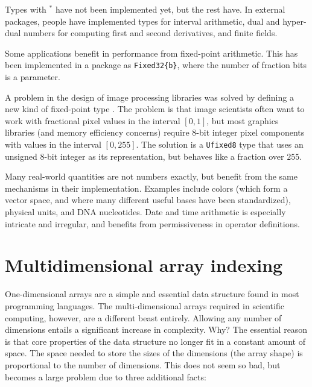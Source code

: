 \noindent
Types with $^*$ have not been implemented yet, but the rest have.
In external packages, people have implemented types for interval arithmetic,
dual and hyper-dual numbers for computing first and second derivatives,
and finite fields.

Some applications benefit in performance from fixed-point arithmetic.
This has been implemented in a package as \texttt{Fixed32\{b\}}, where
the number of fraction bits is a parameter.

A problem in the design of image processing libraries was solved by
defining a new kind of fixed-point type \cite{ufixed}.
The problem is that image scientists often want to work with fractional
pixel values in the interval $[0,1]$, but most graphics libraries (and memory
efficiency concerns) require 8-bit integer pixel components with
values in the interval $[0,255]$.
The solution is a \texttt{Ufixed8} type that uses an unsigned 8-bit integer
as its representation, but behaves like a fraction over $255$.

Many real-world quantities are not numbers exactly, but benefit from the
same mechanisms in their implementation.
Examples include colors (which form a vector space, and where many different
useful bases have been standardized), physical units, and DNA nucleotides.
Date and time arithmetic is especially intricate and irregular, and
benefits from permissiveness in operator definitions.


\section{Multidimensional array indexing}
\label{sec:ndindexing}

One-dimensional arrays are a simple and essential data structure found in
most programming languages.
The multi-dimensional arrays required in scientific computing, however, are
a different beast entirely.
Allowing any number of dimensions entails a significant increase in complexity.
Why?
The essential reason is that core properties of the data structure no
longer fit in a constant amount of space.
The space needed to store the sizes of the dimensions (the array shape) is
proportional to the number of dimensions.
This does not seem so bad, but becomes a large problem due to three additional
facts:

